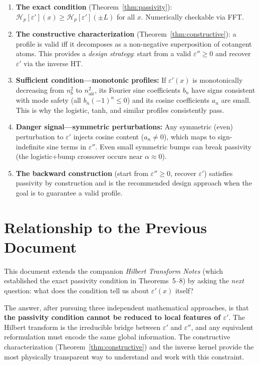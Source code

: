 \documentclass[11pt]{article}
\newcommand{\eps}{\varepsilon}
\newcommand{\Hp}{\mathcal{H}_p}
\begin{document}
\begin{enumerate}
\item \textbf{The exact condition} (Theorem~\ref{thm:passivity}): $\Hp[\eps'](x) \geq \Hp[\eps'](\pm L)$ for all $x$.  Numerically checkable via FFT.

\item \textbf{The constructive characterization} (Theorem~\ref{thm:constructive}): a profile is valid iff it decomposes as a non-negative superposition of cotangent atoms.  This provides a \emph{design strategy}: start from a valid $\eps'' \geq 0$ and recover $\eps'$ via the inverse HT.

\item \textbf{Sufficient condition---monotonic profiles:}  If $\eps'(x)$ is monotonically decreasing from $n_b^2$ to $n_{\text{air}}^2$, its Fourier sine coefficients $b_n$ have signs consistent with mode safety (all $b_n(-1)^n \leq 0$) and its cosine coefficients $a_n$ are small.  This is why the logistic, tanh, and similar profiles consistently pass.

\item \textbf{Danger signal---symmetric perturbations:}  Any symmetric (even) perturbation to $\eps'$ injects cosine content ($a_n \neq 0$), which maps to sign-indefinite sine terms in $\eps''$.  Even small symmetric bumps can break passivity (the logistic+bump crossover occurs near $\alpha \approx 0$).

\item \textbf{The backward construction} (start from $\eps'' \geq 0$, recover $\eps'$) satisfies passivity by construction and is the recommended design approach when the goal is to guarantee a valid profile.
\end{enumerate}

\section{Relationship to the Previous Document}

This document extends the companion \textit{Hilbert Transform Notes} (which established the exact passivity condition in Theorems~5--8) by asking the \emph{next} question: what does the condition tell us about $\eps'(x)$ itself?

The answer, after pursuing three independent mathematical approaches, is that \textbf{the passivity condition cannot be reduced to local features of $\eps'$}.  The Hilbert transform is the irreducible bridge between $\eps'$ and $\eps''$, and any equivalent reformulation must encode the same global information.  The constructive characterization (Theorem~\ref{thm:constructive}) and the inverse kernel provide the most physically transparent way to understand and work with this constraint.
\end{document}
